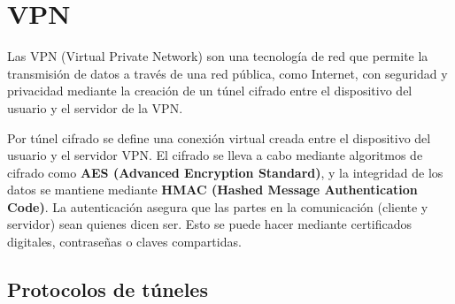 \section{VPN} %
Las VPN (Virtual Private Network) son una tecnología de red que permite la transmisión de datos a través de una red pública, como Internet, con seguridad y privacidad mediante la creación de un túnel cifrado entre el dispositivo del usuario y el servidor de la VPN. 

Por túnel cifrado se define una conexión virtual creada entre el dispositivo del usuario y el servidor VPN. El cifrado se lleva a cabo mediante algoritmos de cifrado como \textbf{AES (Advanced Encryption Standard)}, y la integridad de los datos se mantiene mediante \textbf{HMAC (Hashed Message Authentication Code)}. La autenticación asegura que las partes en la comunicación (cliente y servidor) sean quienes dicen ser. Esto se puede hacer mediante certificados digitales, contraseñas o claves compartidas.

\subsection{Protocolos de túneles}

